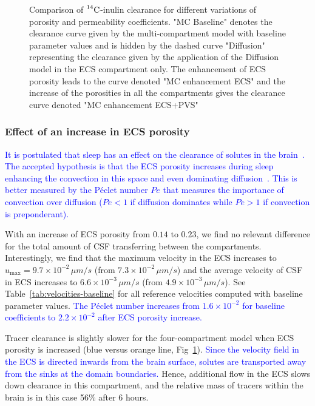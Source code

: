 \documentclass[10pt]{article}
\newcommand{\1}{^{(1)}}
\newcommand{\2}{^{(2)}}
\newcommand{\Cinulin}{$\prescript{14}{}{\text{C}}$-inulin }
\newcommand{\corr}[1]{\textcolor{blue}{#1}}
\begin{document}
\begin{figure}[htbp]
         \centering
        \caption{Comparison of \Cinulin clearance for different variations of porosity and permeability coefficients. "MC Baseline" denotes the  clearance curve given by the multi-compartment model with baseline parameter values and is hidden by the dashed curve "Diffusion" representing the clearance given by the application of the Diffusion model in the ECS compartment only. The enhancement of ECS porosity leads to the curve denoted "MC enhancement ECS" and  the increase of the porosities in all the compartments gives the clearance curve denoted "MC enhancement ECS+PVS"}
        \label{fig:compare-poro}
\end{figure}



\subsubsection{Effect of an increase in ECS porosity}
\corr{It is postulated that sleep has an effect on the clearance of solutes in the brain~\cite{Xie_2013_sleep}. The accepted hypothesis is that the ECS porosity increases during sleep enhancing the convection in this space and even dominating diffusion~\cite{Xie_2013_sleep,thomas2022theoretical}.  This is better measured by the P\'eclet number $Pe$ that measures the importance of convection over diffusion ($Pe<1$ if diffusion dominates while $Pe>1$ if convection is preponderant).}

With an increase of ECS porosity from $0.14$ to $0.23$, we find no relevant difference for the total amount of CSF transferring between the compartments. Interestingly, we find that the maximum velocity in the ECS increases to $u_\text{max} = 9.7\times 10^{-2}\, \si{\mu m/s}$ (from $7.3 \times 10^{-2}\, \si{\mu m/s}$) and the average velocity of CSF in ECS increases to $6.6\times 10^{-3}\, \si{\mu m/s}$ (from $4.9\times 10^{-3}\, \si{\mu m/s}$). See Table~\ref{tab:velocities-baseline} for all reference velocities computed with baseline parameter values. \corr{The P\'eclet number increases from $1.6 \times 10^{-2}$ for baseline coefficients to $2.2\times 10^{-2}$ after ECS porosity increase.}

Tracer clearance is slightly slower for the four-compartment model when ECS porosity is increased (blue versus orange line, Fig~\ref{fig:compare-poro}). \corr{Since the velocity field in the ECS  is directed inwards from the brain surface, solutes are transported away from the sinks at the domain boundaries.} Hence,
additional flow in the ECS slows down clearance in this compartment, and the relative mass of tracers within the brain is in this case 56\% after 6 hours. 
\end{document}

